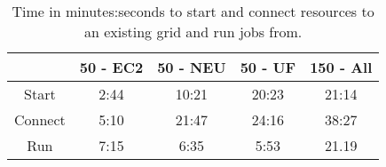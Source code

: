 \begin{table}[ht]
\centering
\begin{tabular}{|c||c|c|c|c|} \hline
& 50 - EC2 & 50 - NEU & 50 - UF & 150 - All \\ \hline\hline
Start & 2:44 & 10:21 & 20:23 & 21:14 \\ \hline
Connect & 5:10 & 21:47 & 24:16 & 38:27\\ \hline
Run & 7:15 & 6:35 & 5:53 & 21.19 \\ \hline
\end{tabular}
\caption[Grid creation times]{Time in minutes:seconds to start and connect
resources to an existing grid and run jobs from.}
\label{fig:results}
\end{table}

